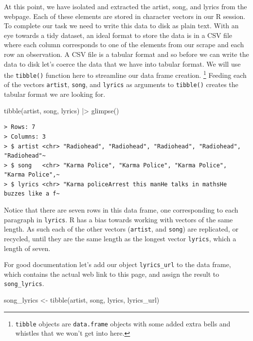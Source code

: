 \documentclass[
  letterpaper,
]{latex/krantz}
\newenvironment{Shaded}{\begin{snugshade}}{\end{snugshade}}
\newcommand{\FunctionTok}[1]{\textcolor[rgb]{0.00,0.00,0.00}{#1}}
\newcommand{\NormalTok}[1]{\textcolor[rgb]{0.00,0.00,0.00}{#1}}
\newcommand{\OtherTok}[1]{\textcolor[rgb]{0.00,0.00,0.00}{#1}}
\newcommand{\SpecialCharTok}[1]{\textcolor[rgb]{0.00,0.00,0.00}{#1}}
\begin{document}
At this point, we have isolated and extracted the artist, song, and
lyrics from the webpage. Each of these elements are stored in character
vectors in our R session. To complete our task we need to write this
data to disk as plain text. With an eye towards a tidy dataset, an ideal
format to store the data is in a CSV file where each column corresponds
to one of the elements from our scrape and each row an observation. A
CSV file is a tabular format and so before we can write the data to disk
let's coerce the data that we have into tabular format. We will use the
\texttt{tibble()} function here to streamline our data frame creation.
\footnote{\texttt{tibble} objects are \texttt{data.frame} objects with
  some added extra bells and whistles that we won't get into here.}
Feeding each of the vectors \texttt{artist}, \texttt{song}, and
\texttt{lyrics} as arguments to \texttt{tibble()} creates the tabular
format we are looking for.

\begin{Shaded}
\begin{Highlighting}[]
\FunctionTok{tibble}\NormalTok{(artist, song, lyrics) }\SpecialCharTok{|\textgreater{}} 
  \FunctionTok{glimpse}\NormalTok{()}
\end{Highlighting}
\end{Shaded}

\begin{verbatim}
> Rows: 7
> Columns: 3
> $ artist <chr> "Radiohead", "Radiohead", "Radiohead", "Radiohead", "Radiohead"~
> $ song   <chr> "Karma Police", "Karma Police", "Karma Police", "Karma Police",~
> $ lyrics <chr> "Karma policeArrest this manHe talks in mathsHe buzzes like a f~
\end{verbatim}

Notice that there are seven rows in this data frame, one corresponding
to each paragraph in \texttt{lyrics}. R has a bias towards working with
vectors of the same length. As such each of the other vectors
(\texttt{artist}, and \texttt{song}) are replicated, or recycled, until
they are the same length as the longest vector \texttt{lyrics}, which a
length of seven.

For good documentation let's add our object \texttt{lyrics\_url} to the
data frame, which contains the actual web link to this page, and assign
the result to \texttt{song\_lyrics}.

\begin{Shaded}
\begin{Highlighting}[]
\NormalTok{song\_lyrics }\OtherTok{\textless{}{-}} \FunctionTok{tibble}\NormalTok{(artist, song, lyrics, lyrics\_url)}
\end{Highlighting}
\end{Shaded}
\end{document}
